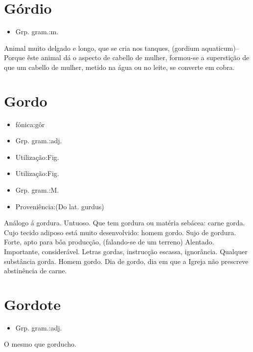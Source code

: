 \section{Górdio}
\begin{itemize}
\item {Grp. gram.:m.}
\end{itemize}
Animal muito delgado e longo, que se cria nos tanques, (\textunderscore gordium aquaticum\textunderscore )--Porque êste animal dá o aspecto de cabello de mulher, formou-se a superstição de que um cabello de mulher, metido na água ou no leite, se converte em cobra.
\section{Gordo}
\begin{itemize}
\item {fónica:gôr}
\end{itemize}
\begin{itemize}
\item {Grp. gram.:adj.}
\end{itemize}
\begin{itemize}
\item {Utilização:Fig.}
\end{itemize}
\begin{itemize}
\item {Utilização:Fig.}
\end{itemize}
\begin{itemize}
\item {Grp. gram.:M.}
\end{itemize}
\begin{itemize}
\item {Proveniência:(Do lat. \textunderscore gurdus\textunderscore )}
\end{itemize}
Análogo á gordura.
Untuoso.
Que tem gordura ou matéria sebácea: \textunderscore carne gorda\textunderscore .
Cujo tecido adiposo está muito desenvolvido: \textunderscore homem gordo\textunderscore .
Sujo de gordura.
Forte, apto para bôa producção, (falando-se de um terreno)
Alentado.
Importante, considerável.
\textunderscore Letras gordas\textunderscore , instrucção escassa, ignorância.
Qualquer substância gorda.
Homem gordo.
\textunderscore Dia de gordo\textunderscore , dia em que a Igreja não prescreve abstinência de carne.
\section{Gordote}
\begin{itemize}
\item {Grp. gram.:adj.}
\end{itemize}
O mesmo que \textunderscore gorducho\textunderscore .
